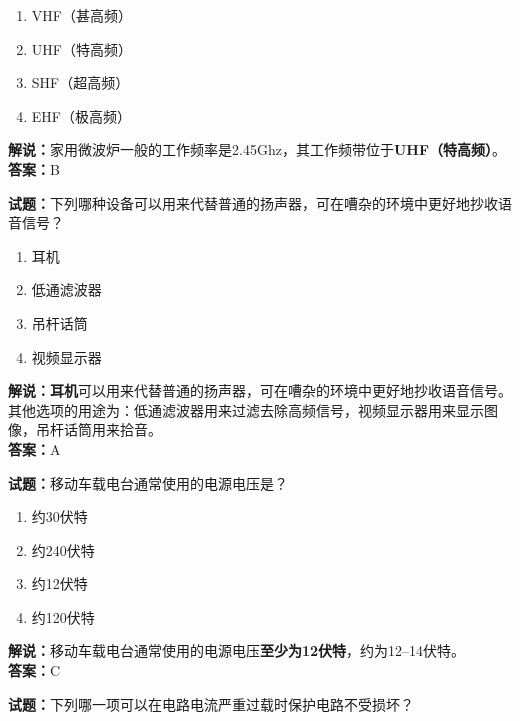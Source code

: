 \documentclass{ctexbook}
\begin{document}
\begin{enumerate}[leftmargin=3em]
  \item VHF（甚高频）
  \item UHF（特高频）
  \item SHF（超高频）
  \item EHF（极高频）
\end{enumerate}

\noindent\textbf{解说：}家用微波炉一般的工作频率是2.45Ghz，其工作频带位于\textbf{UHF（特高频）}。\\\noindent\textbf{答案：}B

\vspace{\baselineskip}

\noindent\textbf{试题：}下列哪种设备可以用来代替普通的扬声器，可在嘈杂的环境中更好地抄收语音信号？

\begin{enumerate}[leftmargin=3em]
  \item 耳机
  \item 低通滤波器
  \item 吊杆话筒
  \item 视频显示器
\end{enumerate}

\noindent\textbf{解说：耳机}可以用来代替普通的扬声器，可在嘈杂的环境中更好地抄收语音信号。其他选项的用途为：低通滤波器用来过滤去除高频信号，视频显示器用来显示图像，吊杆话筒用来拾音。\\\noindent\textbf{答案：}A

\vspace{\baselineskip}

\noindent\textbf{试题：}移动车载电台通常使用的电源电压是？

\begin{enumerate}[leftmargin=3em]
  \item 约\num{30}伏特
  \item 约\num{240}伏特
  \item 约\num{12}伏特
  \item 约\num{120}伏特
\end{enumerate}

\noindent\textbf{解说：}移动车载电台通常使用的电源电压\textbf{至少为\num{12}伏特}，约为\numrange{12}{14}伏特。\\\noindent\textbf{答案：}C

\vspace{\baselineskip}

\noindent\textbf{试题：}下列哪一项可以在电路电流严重过载时保护电路不受损坏？
\end{document}
